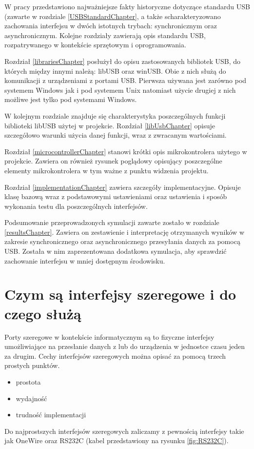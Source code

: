 \documentclass{BscUS}
\begin{document}
W pracy przedstawiono najważniejsze fakty historyczne dotyczące standardu USB (zawarte w rozdziale \ref{USBStandardChapter}, a także scharakteryzowano zachowania interfejsu w dwóch istotnych trybach: synchronicznym oraz asynchronicznym. Kolejne rozdziały zawierają opis standardu USB, rozpatrywanego w kontekście sprzętowym i oprogramowania.

Rozdział \ref{librariesChapter} posłużył do opisu zastosowanych bibliotek USB, do których między innymi należą: libUSB oraz winUSB. Obie z nich służą do komunikacji z urządzeniami z portami USB. Pierwsza używana jest zarówno pod systemem Windows jak i pod systemem Unix natomiast użycie drugiej z nich możliwe jest tylko pod systemami Windows.

W kolejnym rozdziale znajduje się charakterystyka poszczególnych funkcji biblioteki libUSB użytej w projekcie. Rozdział \ref{libUsbChapter} opisuje szczegółowo warunki użycia danej funkcji, wraz z zwracanym wartościami. 

Rozdział \ref{microcontrollerChapter} stanowi krótki opis mikrokontrolera użytego w projekcie. Zawiera on również rysunek poglądowy opisujący poszczególne elementy mikrokontrolera w tym ważne z punktu widzenia projektu.

Rozdział \ref{implementationChapter} zawiera szczegóły implementacyjne. Opisuje klasę bazową wraz z podstawowymi ustawieniami oraz ustawienia i sposób wykonania testu dla poszczególnych interfejsów.

Podsumowanie przeprowadzonych symulacji zawarte zostało w rozdziale \ref{resultsChapter}. Zawiera on zestawienie i interpretację otrzymanych wyników w zakresie synchronicznego oraz asynchronicznego przesyłania danych za pomocą USB. Została w nim zaprezentowana dodatkowa symulacja, aby sprawdzić zachowanie interfejsu w mniej dostępnym środowisku.
\fi
\chapter{Czym są interfejsy szeregowe i do czego służą}
\label{ch:serialInterface}
\indent Porty szeregowe w kontekście informatycznym są to fizyczne interfejsy umożliwiające na przesłanie danych z lub do urządzenia w jednostce czasu jeden za drugim. Cechy interfejsów szeregowych można opisać za pomocą trzech prostych punktów.
\begin{itemize}
\item prostota
\item wydajność
\item trudność implementacji
\end{itemize}
Do najprostszych interfejsów szeregowych zaliczamy z pewnością interfejsy takie jak OneWire oraz RS232C (kabel przedstawiony na rysunku \ref{fig:RS232C}).
\end{document}
